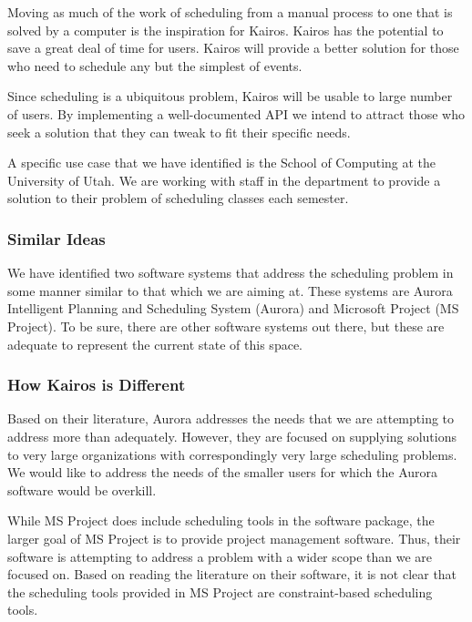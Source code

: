 \documentclass{extarticle}
\begin{document}
Moving as much of the work of scheduling from a manual process to one that is solved by a computer is the
inspiration for Kairos.  Kairos has the potential to save a great deal of time for users.  Kairos will provide a
better solution for those who need to schedule any but the simplest of events.

Since scheduling is a ubiquitous problem, Kairos will be usable to large number of users.  By implementing a
well-documented API we intend to attract those who seek a solution that they can tweak to fit their specific needs.

A specific use case that we have identified is the School of Computing at the University of Utah.  We are working
with staff in the department to provide a solution to their problem of scheduling classes each semester.

\subsubsection{Similar Ideas}
We have identified two software systems that address the scheduling problem in some manner similar to that which
we are aiming at.  These systems are Aurora Intelligent Planning and Scheduling System (Aurora) and Microsoft
Project (MS Project).  To be sure, there are other software systems out there, but these are adequate to represent
the current state of this space.

\subsubsection{How Kairos is Different}
Based on their literature, Aurora addresses the needs that we are attempting to address more than adequately.
However, they are focused on supplying solutions to very large organizations with correspondingly very large
scheduling problems.  We would like to address the needs of the smaller users for which the Aurora software would
be overkill.

While MS Project does include scheduling tools in the software package, the larger goal of MS Project is to provide
project management software.  Thus, their software is attempting to address a problem with a wider scope than we
are focused on.  Based on reading the literature on their software, it is not clear that the scheduling tools
provided in MS Project are constraint-based scheduling tools.
\end{document}
